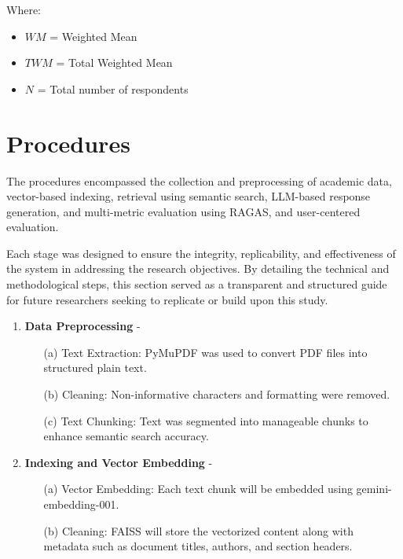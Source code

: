 \begin{refsection}
Where:
\begin{itemize}
    \item $WM$ = Weighted Mean
    \item $TWM$ = Total Weighted Mean
    \item $N$ = Total number of respondents
\end{itemize}

\section{Procedures}

The procedures encompassed the collection and preprocessing of academic data, vector-based indexing, retrieval using semantic search, LLM-based response generation, and multi-metric evaluation using RAGAS, and user-centered evaluation.

Each stage was designed to ensure the integrity, replicability, and effectiveness of the system in addressing the research objectives. By detailing the technical and methodological steps, this section served as a transparent and structured guide for future researchers seeking to replicate or build upon this study.



\begin{enumerate}

    \item \textbf{Data Preprocessing} - 
        \begin{enumerate}
            \item [(a)] {Text Extraction:} PyMuPDF was used to convert PDF files into structured plain text.
            \item [(b)] {Cleaning:} Non-informative characters and formatting were removed.
            \item [(c)] {Text Chunking:} Text was segmented into manageable chunks to enhance semantic search accuracy.
        \end{enumerate}
        
    \item \textbf{Indexing and Vector Embedding} - 
        \begin{enumerate}
            \item [(a)] {Vector Embedding:} Each text chunk will be embedded using gemini-embedding-001.
            \item [(b)] {Cleaning:} FAISS will store the vectorized content along with metadata such as document titles, authors, and section headers.
        \end{enumerate}


\end{enumerate}
\end{refsection}
